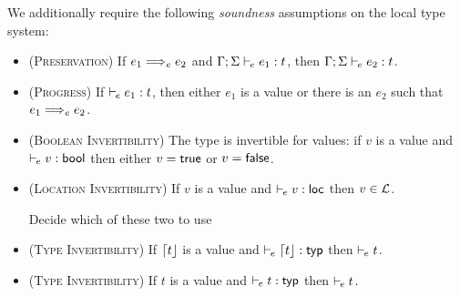 \label{sec:sound-type-systems}
We additionally require the following \emph{soundness} assumptions on the local type system:
\begin{itemize}
	\item (\textsc{Preservation}) If $e_1 \localstep e_2$ and $\Gamma;\Sigma \vdash_{\mkern-2mu e} e_1 : t$, then $\Gamma;\Sigma \vdash_{\mkern-2mu e} e_2 : t$.

	\item (\textsc{Progress}) If $\vdash_{\mkern-2mu e} e_1 : t$, then either $e_1$ is a value or there is an $e_2$ such that $e_1 \localstep e_2$.

	\item (\textsc{Boolean Invertibility}) The type \Bool is invertible for values: if $v$ is a value and $\vdash_{\mkern-2mu e} v : \mathsf{bool}$ then either $v = \mathsf{true}$ or $v = \mathsf{false}$.

	\item (\textsc{Location Invertibility}) If $v$ is a value and $\vdash_{\mkern-2mu e} v : \mathsf{loc}$ then $v \in \mathcal{L}$.

  \todo Decide which of these two to use
  
	\item (\textsc{Type Invertibility}) If $\lceil t\rfloor$ is a value and $\vdash_{\mkern-2mu e} \lceil t\rfloor : \mathsf{typ}$ then $\vdash_{\mkern-2mu e} t$.

 	\item (\textsc{Type Invertibility}) If $t$ is a value and $\vdash_{\mkern-2mu e} t : \mathsf{typ}$ then $\vdash_{\mkern-2mu e} t$.
\end{itemize}

